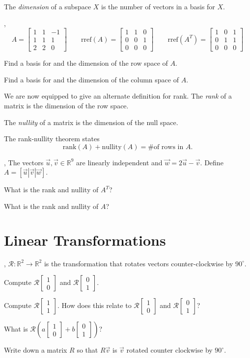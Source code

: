 \documentclass{article}
\newcommand{\R}{\mathbb{R}}
\newcommand{\rref}{\mathrm{rref}}
\newcommand{\rank}{\mathrm{rank}}
\newcommand{\nnul}{\mathrm{nullity}}
\newcommand{\mat}[1]{\begin{bmatrix}#1\end{bmatrix}}
\begin{document}
\begin{Def}
The \emph{dimension} of a subspace $X$ is the number of vectors in a basis for $X$.
\end{Def}

\sep
\[
	A=\mat{1&1&-1\\1&1&1\\2&2&0}\qquad
	\rref(A)=\mat{1&1&0\\0&0&1\\0&0&0}\qquad
	\rref(A^T)=\mat{1&0&1\\0&1&1\\0&0&0}
\]

\begin{Enum}
	\item Find a basis for and the dimension of the row space of $A$.
	\item Find a basis for and the dimension of the column space of $A$.
\end{Enum}

\begin{Def}
We are now equipped to give an alternate definition for rank.  The \emph{rank}
of a matrix is the dimension of the row space.

The \emph{nullity} of a matrix is the dimension of the null space.

The rank-nullity theorem states
\[
	\rank(A)+\nnul(A) = \#\text{of rows in }A.
\]
\end{Def}

\sep
The vectors $\vec u,\vec v\in\R^9$ are linearly independent and $\vec w=2\vec u-\vec v$.
Define $A=[\vec u|\vec v|\vec w]$.
\begin{Enum}
	\item What is the rank and nullity of $A^T$?
	\item What is the rank and nullity of $A$?
\end{Enum}

\newpage
\section*{Linear Transformations}

\sep
$\mathcal R:\R^2\to\R^2$ is the transformation that rotates vectors counter-clockwise 
by $90^\circ$.
\begin{Enum}
	\item Compute $\mathcal R\mat{1\\0}$ and $\mathcal R\mat{0\\1}$.
	\item Compute $\mathcal R\mat{1\\1}$.  How does this relate to
		$\mathcal R\mat{1\\0}$ and $\mathcal R\mat{0\\1}$?
	\item What is $\mathcal R\left(a\mat{1\\0}+b\mat{0\\1}\right)$?
	\item Write down a matrix $R$ so that $R\vec v$ is $\vec v$ rotated
		counter clockwise by $90^\circ$.
\end{Enum}
\end{document}
